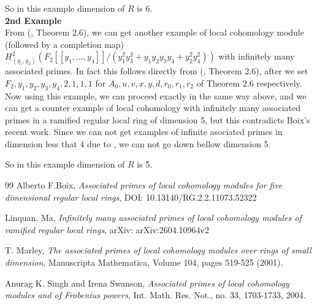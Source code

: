 \documentclass[10pt]{amsart}
\theoremstyle{plain}
\theoremstyle{definition}
\begin{document}
So in this example dimension of $R$ is 6.\\

{\bf 2nd Example}\\
 
From (\cite{SS}, Theorem 2.6), we can get another example of local cohomology module (followed by a completion map) $H^2_{(y_1,y_2)} (F_2[[y_1,\ldots, y_4]]/(y^2_1 y^2_3  + y_1y_2y_3y_4 + y^2_2 y^2_4 ))$ with infinitely many associated primes. In fact this follows directly from (\cite{SS}, Theorem 2.6), after we set $F_2, y_1, y_2, y_3, y_4, 2, 1, 1, 1$  for $A_0, u, v, x, y, d, r_0, r_1, r_2$ of Theorem 2.6 respectively. Now using this example, we can proceed exactly in the same way above, and we can get a counter example of local cohomology with infinitely many associated primes in a ramified regular local ring of dimension 5, but this contradicts Boix's recent work. Since we can not get examples of infinite asociated primes in dimension less that 4 due to \cite{Mar}, we can not go down bellow dimension 5. 

So in this example dimension of $R$ is 5.



\begin{thebibliography}{99}
 Alberto F.Boix, {\it Associated primes of local cohomology modules for five dimensional regular local rings}, DOI: 10.13140/RG.2.2.11073.52322

Linquan. Ma, \emph{Infinitely many associated primes of local cohomology modules of ramified regular local rings}, arXiv:  arXiv:2604.10964v2

T. Marley, \emph{The associated primes of local cohomology modules over rings of small dimension}, Manuscripta Mathematica, Volume 104, pages 519-525 (2001).

Anurag K. Singh and Irena Swanson, {\it Associated primes of local cohomology modules and of Frobenius powers}, Int. Math. Res. Not., no. 33, 1703-1733, 2004.
\end{thebibliography}
\end{document}
